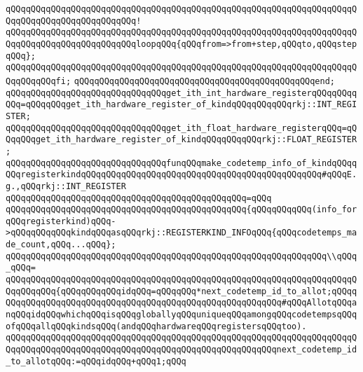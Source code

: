 \verb|qQQqqQQqqQQqqQQqqQQqqQQqqQQqqQQqqQQqqQQqqQQqqQQqqQQqqQQqqQQqqQQqqQQqqQQqqQQqqQQqqQQqqQQqqQQqqQQq!|\newline
\verb|qQQqqQQqqQQqqQQqqQQqqQQqqQQqqQQqqQQqqQQqqQQqqQQqqQQqqQQqqQQqqQQqqQQqqQQqqQQqqQQqqQQqqQQqqQQqqQQqloopqQQq{qQQqfrom=>from+step,qQQqto,qQQqstepqQQq};|\newline
\verb|qQQqqQQqqQQqqQQqqQQqqQQqqQQqqQQqqQQqqQQqqQQqqQQqqQQqqQQqqQQqqQQqqQQqqQQqqQQqqQQqfi;|\newline
\verb|qQQqqQQqqQQqqQQqqQQqqQQqqQQqqQQqqQQqqQQqqQQqqQQqend;|\newline
\newline
\newline
\verb|qQQqqQQqqQQqqQQqqQQqqQQqqQQqqQQqget_ith_int_hardware_registerqQQqqQQqqQQq=qQQqqQQqget_ith_hardware_register_of_kindqQQqqQQqqQQqrkj::INT_REGISTER;|\newline
\verb|qQQqqQQqqQQqqQQqqQQqqQQqqQQqqQQqget_ith_float_hardware_registerqQQq=qQQqqQQqget_ith_hardware_register_of_kindqQQqqQQqqQQqrkj::FLOAT_REGISTER;|\newline
\newline
\newline
\verb|qQQqqQQqqQQqqQQqqQQqqQQqqQQqqQQqfunqQQqmake_codetemp_info_of_kindqQQqqQQqregisterkindqQQqqQQqqQQqqQQqqQQqqQQqqQQqqQQqqQQqqQQqqQQqqQQq#qQQqE.g.,qQQqrkj::INT_REGISTER|\newline
\verb|qQQqqQQqqQQqqQQqqQQqqQQqqQQqqQQqqQQqqQQqqQQqqQQq=qQQq|\newline
\verb|qQQqqQQqqQQqqQQqqQQqqQQqqQQqqQQqqQQqqQQqqQQqqQQq{qQQqqQQqqQQq(info_forqQQqregisterkind)qQQq->qQQqqQQqqQQqkindqQQqasqQQqrkj::REGISTERKIND_INFOqQQq{qQQqcodetemps_made_count,qQQq...qQQq};|\newline
\newline
\verb|qQQqqQQqqQQqqQQqqQQqqQQqqQQqqQQqqQQqqQQqqQQqqQQqqQQqqQQqqQQqqQQq\\qQQq_qQQq=|\newline
\verb|qQQqqQQqqQQqqQQqqQQqqQQqqQQqqQQqqQQqqQQqqQQqqQQqqQQqqQQqqQQqqQQqqQQqqQQqqQQqqQQq{qQQqqQQqqQQqidqQQq=qQQqqQQq*next_codetemp_id_to_allot;qQQqqQQqqQQqqQQqqQQqqQQqqQQqqQQqqQQqqQQqqQQqqQQqqQQqqQQqqQQq#qQQqAllotqQQqanqQQqidqQQqwhichqQQqisqQQqgloballyqQQquniqueqQQqamongqQQqcodetempsqQQqofqQQqallqQQqkindsqQQq(andqQQqhardwareqQQqregistersqQQqtoo).|\newline
\verb|qQQqqQQqqQQqqQQqqQQqqQQqqQQqqQQqqQQqqQQqqQQqqQQqqQQqqQQqqQQqqQQqqQQqqQQqqQQqqQQqqQQqqQQqqQQqqQQqqQQqqQQqqQQqqQQqqQQqqQQqqQQqnext_codetemp_id_to_allotqQQq:=qQQqidqQQq+qQQq1;qQQq|\newline
